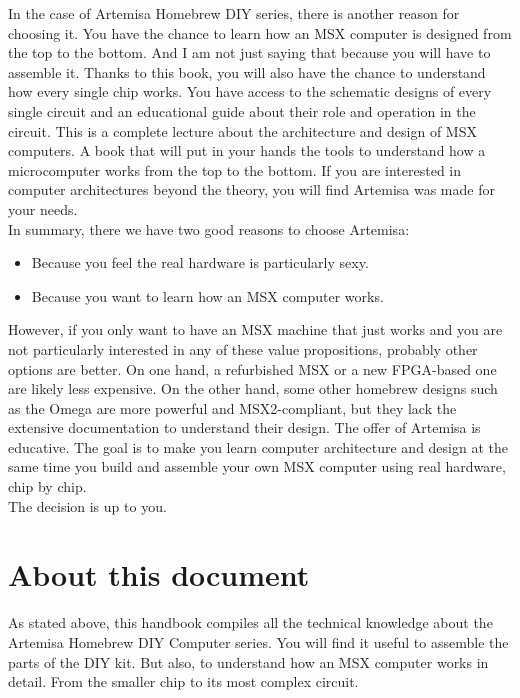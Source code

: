 In the case of Artemisa Homebrew DIY series, there is another reason for choosing it. You have the chance to learn how an MSX computer is designed from the top to the bottom. And I am not just saying that because you will have to assemble it. Thanks to this book, you will also have the chance to understand how every single chip works. You have access to the schematic designs of every single circuit and an educational guide about their role and operation in the circuit. This is a complete lecture about the architecture and design of MSX computers. A book that will put in your hands the tools to understand how a microcomputer works from the top to the bottom. If you are interested in computer architectures beyond the theory, you will find Artemisa was made for your needs. \\

In summary, there we have two good reasons to choose Artemisa: 
\begin{itemize}
	\item Because you feel the real hardware is particularly sexy.
	\item Because you want to learn how an MSX computer works.
\end{itemize}

However, if you only want to have an MSX machine that just works and you are not particularly interested in any of these value propositions, probably other options are better. On one hand, a refurbished MSX or a new FPGA-based one are likely less expensive. On the other hand, some other homebrew designs such as the Omega are more powerful and MSX2-compliant, but they lack the extensive documentation to understand their design. The offer of Artemisa is educative. The goal is to make you learn computer architecture and design at the same time you build and assemble your own MSX computer using real hardware, chip by chip. \\

The decision is up to you.\\

\section{About this document}

As stated above, this handbook compiles all the technical knowledge about the Artemisa Homebrew DIY Computer series. You will find it useful to assemble the parts of the DIY kit. But also, to understand how an MSX computer works in detail. From the smaller chip to its most complex circuit. 

